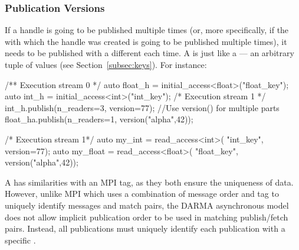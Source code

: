 \subsubsection{Publication Versions}
If a \gls{handle} is going to be published multiple times (or, more specifically, if
the  with which the \gls{handle} was created is going to be published multiple
times), it needs to be published with a different  each time.  
A  is just like a  --- an arbitrary \gls{tuple} of values (see Section~\ref{subsec:keys}).  
For instance:

\begin{minipage}{0.5\textwidth}
\begin{CppCode}
/** Execution stream 0 */
auto float_h =
  initial_access<float>("float_key");
auto int_h =
  initial_access<int>("int_key");
/* Execution stream 1 */
int_h.publish(n_readers=3, version=77);
//Use version() for multiple parts
float_ha.publish(n_readers=1, 
    version("alpha",42));
\end{CppCode}
\end{minipage}
\begin{minipage}{0.45\textwidth}
\begin{CppCode}
/* Execution stream 1*/
auto my_int =  read_access<int>(
  "int_key", version=77);
auto my_float = read_access<float>(
  "float_key", version("alpha",42));
\end{CppCode}
\end{minipage}

A  has similarities with an MPI tag, as they both ensure the uniqueness of data.
However, unlike MPI which uses a combination of message order and tag to
uniquely identify messages and match  pairs,
the \gls{DARMA} asynchronous model does not allow implicit publication order to
be used in matching \gls{publish}/\gls{fetch} pairs.
Instead, all publications must uniquely identify each publication with a
specific .


